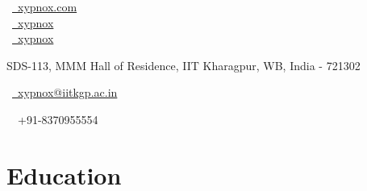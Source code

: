 \documentclass[a4paper,12pt]{extarticle} %
\begin{document}
\pagestyle{empty} %


\begin{multicols}{3}
\normalsize  \faGlobe\ {\href{http://xypnox.com/}{\  xypnox.com}}\\
\normalsize \faGithub\ {\href{https://github.com/xypnox}{\  xypnox}}\\
\normalsize  \faTwitter\ {\href{https://twitter.com/xypnox}{\  xypnox}}\\
\columnbreak
\normalsize\par{} %
\vspace{-0.1cm}
\par{\centering\normalsize {SDS-113, MMM Hall of Residence, IIT Kharagpur, WB, India - 721302}\hfill\par}
\columnbreak
\raggedright\hfill\normalsize \faEnvelope\ {\href{mailto:xypnox@iitkgp.ac.in}{\  xypnox@iitkgp.ac.in}}\\
\raggedright\hfill{\faPhone\ \  +91-8370955554}
\end{multicols}

\vspace{-0.5cm}



\section{\textcolor{primary}{Education}}
\end{document}
